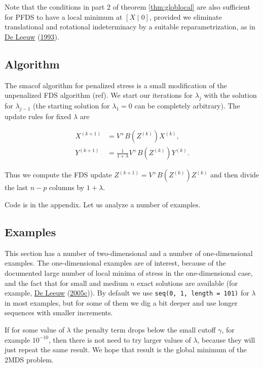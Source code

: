 \documentclass[
  12pt,
]{book}
\theoremstyle{definition}
\theoremstyle{definition}
\theoremstyle{definition}
\theoremstyle{definition}
\theoremstyle{remark}
\begin{document}
Note that the conditions in part 2 of theorem \ref{thm:globlocal} are also sufficient for PFDS to have a local minimum at \([X\mid 0]\), provided we eliminate translational and rotational indeterminacy by a suitable reparametrization, as in \protect\hyperlink{ref-deleeuw_R_93c}{De Leeuw} (\protect\hyperlink{ref-deleeuw_R_93c}{1993}).

\hypertarget{algorithm}{%
\subsection{Algorithm}\label{algorithm}}

The smacof algorithm for penalized stress is a small modification of the unpenalized FDS algorithm (ref). We start our iterations for \(\lambda_j\) with the solution for \(\lambda_{j-1}\) (the starting solution for \(\lambda_1=0\) can be completely arbitrary). The update rules for fixed \(\lambda\) are

\begin{align}
X^{(k+1)}&=V^+B(Z^{(k)})X^{(k)},\\
Y^{(k+1)}&=\frac{1}{1+\lambda}V^+B(Z^{(k)})Y^{(k)}.
\end{align}

Thus we compute the FDS update \(Z^{(k+1)}=V^+B(Z^{(k)})Z^{(k)}\) and then divide the last \(n-p\) columns by \(1+\lambda\).

Code is in the appendix. Let us analyze a number of examples.

\hypertarget{examples-3}{%
\subsection{Examples}\label{examples-3}}

This section has a number of two-dimensional and a number of one-dimensional examples. The one-dimensional examples are of interest, because of the documented large number of local minima of stress in the one-dimensional case, and the fact that for small and medium \(n\) exact solutions are available (for example, \protect\hyperlink{ref-deleeuw_C_05h}{De Leeuw} (\protect\hyperlink{ref-deleeuw_C_05h}{2005c})). By default we use \texttt{seq(0,\ 1,\ length\ =\ 101)} for \(\lambda\) in most examples, but for some of them we dig a bit deeper and use longer sequences with smaller increments.

If for some value of \(\lambda\) the penalty term drops below the small cutoff \(\gamma\), for example \ensuremath{10^{-10}}, then there is not need to try larger values of \(\lambda\), because they will just repeat the same result. We hope that result is the global minimum of the 2MDS problem.
\end{document}
